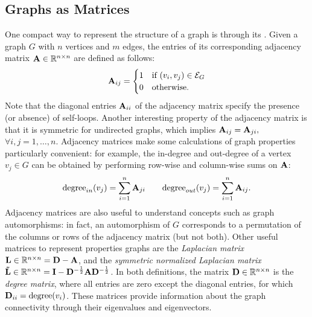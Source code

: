 \subsection{Graphs as Matrices} \label{sec:adj-matrix}
One compact way to represent the structure of a graph is through its  . Given a graph $G$ with $n$ vertices and $m$ edges, the entries of its corresponding  adjacency matrix $\Matrix{A} \in \mathbb{R}^{n \times n}$ are defined as follows:
\[
\Matrix{A}_{ij} =
    \begin{cases}
        1  & \text{if } (v_i, v_j) \in \Cal{E}_G \\
        0  & \text{otherwise.}
    \end{cases}
\]
Note that the diagonal entries $\Matrix{A}_{ii}$ of the adjacency matrix specify the presence  (or absence) of self-loops. Another interesting property of the adjacency matrix is that  it is symmetric for undirected graphs, which implies $\Matrix{A}_{ij} = \Matrix{A}_{ji},$ $\forall i, j = 1, \ldots, n$. Adjacency matrices make some calculations of graph properties particularly convenient: for example, the in-degree and out-degree of a vertex $v_j \in G$
can be obtained by performing row-wise and column-wise sums on $\Matrix{A}$:
$$
\Fun{degree}_{in}(v_j) = \sum_{i=1}^n \Matrix{A}_{ji} \quad \quad \Fun{degree}_{out}(v_j) = \sum_{i=1}^n \Matrix{A}_{ij}.
$$
Adjacency matrices are also useful to understand concepts such as graph automorphisms: in fact, an automorphism of $G$ corresponds to a permutation of the columns or rows of the adjacency matrix (but not both). Other useful matrices to represent properties graphs are the \emph{Laplacian matrix} $\Matrix{L} \in \Real^{n \times n} = \Matrix{D} - \Matrix{A}$, and the \emph{symmetric normalized Laplacian matrix} $\Matrix{\tilde{L}} \in \Real^{n \times n} = \Matrix{I} - \Matrix{D}^{-\frac{1}{2}}\Matrix{A}\Matrix{D}^{-\frac{1}{2}}$. In both definitions, the matrix  $\Matrix{D} \in \Real^{n \times n}$ is the \emph{degree matrix}, where all entries are zero except the diagonal entries, for which $\Matrix{D}_{ii} = \Fun{degree}(v_i)$. These matrices provide information about the graph connectivity through their eigenvalues and eigenvectors.

